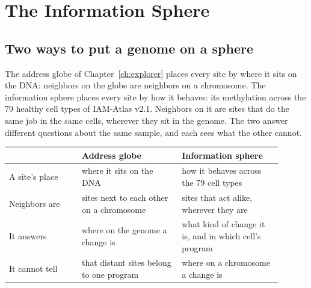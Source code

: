 
\chapter{The Information Sphere}\label{ch:infosphere}

\section{Two ways to put a genome on a sphere}

The address globe of Chapter~\ref{ch:explorer} places every site by where it sits on the DNA: neighbors on the globe are neighbors on a
chromosome. The information sphere places every site by how it behaves: its methylation across the 79 healthy cell types of IAM-Atlas
v2.1. Neighbors on it are sites that do the same job in the same cells, wherever they sit in the genome. The two answer different
questions about the same sample, and each sees what the other cannot.

\begin{center}
\begin{tabular}{p{0.24\linewidth}p{0.33\linewidth}p{0.33\linewidth}}
 & \textbf{Address globe} & \textbf{Information sphere}\\\hline
A site's place & where it sits on the DNA & how it behaves across the 79 cell types\\
Neighbors are & sites next to each other on a chromosome & sites that act alike, wherever they are\\
It answers & where on the genome a change is & what kind of change it is, and in which cell's program\\
It cannot tell & that distant sites belong to one program & where on a chromosome a change is\\
\end{tabular}
\end{center}

